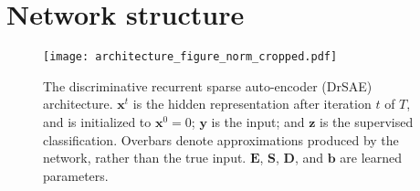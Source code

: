 \documentclass{article} %
\newcommand{\bv}{\mathbf{b}}
\newcommand{\x}{\mathbf{x}}
\newcommand{\y}{\mathbf{y}}
\newcommand{\D}{\mathbf{D}}
\newcommand{\E}{\mathbf{E}}
\newcommand{\Sm}{\mathbf{S}}
\begin{document}
\begin{comment}
Unlike contractive autoencoders \citep{rifai2011a} or tangent propagation \citep{simard1993}, the selected prototype is represented explicitly, facilitating natural and accurate classification.  This is potentially useful, in datapoints belonging to different classes may be composed of a common set of parts.  Indeed, it is often the case that the manifolds corresponding to two different classes touch.  For instance, it is possible to continuously deform a 4 into a 9 while remaining on the data manifold.  The tangent distance provides a consistent and intuitive way to deal with ambiguous points near the intersection of two manifolds.  Tangent propagation alone provides no a priori information about how to deal with these points.  Just as contractive autoencoders extend tangent propagation by requiring that the input distribution be modeled while minimizing the volatility of the output in all directions (and thus certainly in directions of allowed deformations), our networks induce the usage of a particularly natural and informative hidden representation.  
\end{comment}



\section{Network structure}

\begin{figure}[tb]
  \begin{center}
    \texttt{[image: architecture\_figure\_norm\_cropped.pdf]}
  \end{center}
  \caption{The discriminative recurrent sparse auto-encoder (DrSAE) architecture.  $\x^t$ is the hidden representation after iteration $t$ of $T$, and is initialized to $\x^0 = 0$; $\y$ is the input; and $\mathbf{z}$ is the supervised classification.  Overbars denote approximations produced by the network, rather than the true input.  $\E$, $\Sm$, $\D$, and $\bv$ are learned parameters.  \label{architecture_figure}} 
\end{figure}
\end{document}
